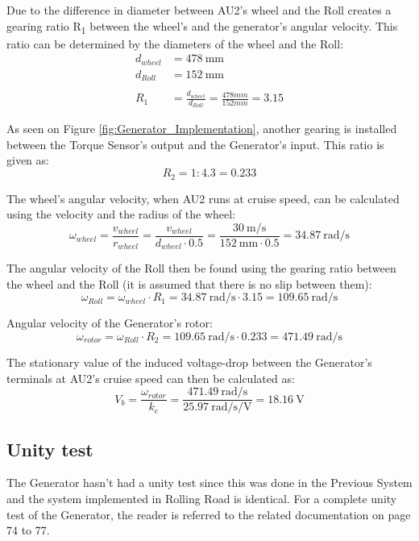 Due to the difference in diameter between AU2's wheel and the Roll creates a gearing ratio R\textsubscript{1} between the wheel's and the generator's angular velocity. This ratio can be determined by the diameters of the wheel and the Roll:
\begin{equation}
	\begin{split}
		d_{wheel} &= \SI{478}{\milli \meter}\\
		d_{Roll} &= \SI{152}{\milli \meter}\\
		\\
		R_1 &= \frac{d_{wheel}}{d_{Roll}} = \frac{478 mm}{152 mm} = 3.15
	\end{split}
\end{equation}

As seen on Figure \vref{fig:Generator_Implementation}, another gearing is installed between the Torque Sensor's output and the Generator's input. This ratio is given as:
\begin{equation}
	R_2 = 1:4.3 = 0.233
\end{equation}

The wheel's angular velocity, when AU2 runs at cruise speed, can be calculated using the velocity and the radius of the wheel:
\begin{equation}
	\omega_{wheel} = \frac{v_{wheel}}{r_{wheel}} = \frac{v_{wheel}}{d_{wheel} \cdot 0.5} = \frac{\SI[per-mode=fraction]{30}{\meter \per \second}}{\SI{152}{\milli \meter} \cdot 0.5} = \SI[per-mode=fraction]{34.87}{\radian \per \second}
\end{equation}

The angular velocity of the Roll then be found using the gearing ratio between the wheel and the Roll (it is assumed that there is no slip between them):
\begin{equation}
		\omega_{Roll} = \omega_{wheel} \cdot R_1 = \SI[per-mode=fraction]{34.87}{\radian \per \second} \cdot 3.15 = \SI[per-mode=fraction]{109.65}{\radian \per \second}
\end{equation}

Angular velocity of the Generator's rotor:
\begin{equation}
		\omega_{rotor} = \omega_{Roll} \cdot R_2 = \SI[per-mode=fraction]{109.65}{\radian \per \second} \cdot 0.233 = \SI[per-mode=fraction]{471.49}{\radian \per \second}
\end{equation}

The stationary value of the induced voltage-drop between the Generator's terminals at AU2's cruise speed can then be calculated as:
\begin{equation}
		V_b = \frac{\omega_{rotor}}{k_e} = \frac{\SI[per-mode=fraction]{471.49}{\radian \per \second}}{\SI[per-mode=fraction]{25.97}{\radian \per \second \per \volt}} = \SI{18.16}{\volt}
\end{equation}

\subsection{Unity test}
The Generator hasn't had a unity test since this was done in the Previous System\cite{BAC_rullefelt} and the system implemented in Rolling Road is identical. For a complete unity test of the Generator, the reader is referred to the related documentation on page 74 to 77.